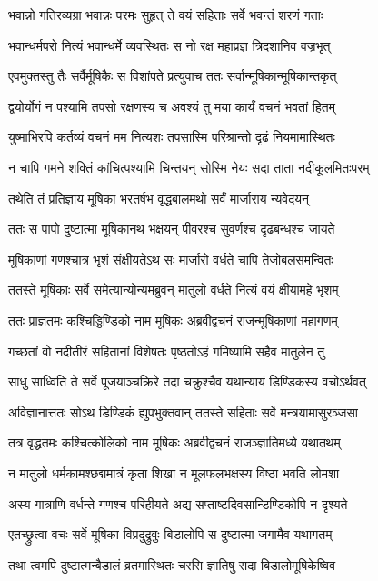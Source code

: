 \twolineshloka
{भवान्नो गतिरव्यग्रा भवान्नः परमः सुहृत्}
{ते वयं सहिताः सर्वे भवन्तं शरणं गताः}


\twolineshloka
{भवान्धर्मपरो नित्यं भवान्धर्मे व्यवस्थितः}
{स नो रक्ष महाप्रज्ञ त्रिदशानिव वज्रभृत्}


\twolineshloka
{एवमुक्तस्तु तैः सर्वैर्मूषिकैः स विशांपते}
{प्रत्युवाच ततः सर्वान्मूषिकान्मूषिकान्तकृत्}


\twolineshloka
{द्वयोर्योगं न पश्यामि तपसो रक्षणस्य च}
{अवश्यं तु मया कार्यं वचनं भवतां हितम्}


\twolineshloka
{युष्माभिरपि कर्तव्यं वचनं मम नित्यशः}
{तपसास्मि परिश्रान्तो दृढं नियमामास्थितः}


\twolineshloka
{न चापि गमने शक्तिं कांचित्पश्यामि चिन्तयन्}
{सोस्मि नेयः सदा ताता नदीकूलमितःपरम्}


\twolineshloka
{तथेति तं प्रतिज्ञाय मूषिका भरतर्षभ}
{वृद्धबालमथो सर्वं मार्जाराय न्यवेदयन्}


\twolineshloka
{ततः स पापो दुष्टात्मा मूषिकानथ भक्षयन्}
{पीवरश्च सुवर्णश्च दृढबन्धश्च जायते}


\twolineshloka
{मूषिकाणां गणश्चात्र भृशं संक्षीयतेऽथ सः}
{मार्जारो वर्धते चापि तेजोबलसमन्वितः}


\twolineshloka
{ततस्ते मूषिकाः सर्वे समेत्यान्योन्यमब्रुवन्}
{मातुलो वर्धते नित्यं वयं क्षीयामहे भृशम्}


\twolineshloka
{ततः प्राज्ञतमः कश्चिड्डिण्डिको नाम मूषिकः}
{अब्रवीद्वचनं राजन्मूषिकाणां महागणम्}


\twolineshloka
{गच्छतां वो नदीतीरं सहितानां विशेषतः}
{पृष्ठतोऽहं गमिष्यामि सहैव मातुलेन तु}


\twolineshloka
{साधु साध्विति ते सर्वे पूजयाञ्चक्रिरे तदा}
{चक्रुश्चैव यथान्यायं डिण्डिकस्य वचोऽर्थवत्}


\twolineshloka
{अविज्ञानात्ततः सोऽथ डिण्डिकं ह्युपभुक्तवान्}
{ततस्ते सहिताः सर्वे मन्त्रयामासुरञ्जसा}


\twolineshloka
{तत्र वृद्धतमः कश्चित्कोलिको नाम मूषिकः}
{अब्रवीद्वचनं राजञ्ज्ञातिमध्ये यथातथम्}


\twolineshloka
{न मातुलो धर्मकामश्छद्ममात्रं कृता शिखा}
{न मूलफलभक्षस्य विष्ठा भवति लोमशा}


\twolineshloka
{अस्य गात्राणि वर्धन्ते गणश्च परिहीयते}
{अद्य सप्ताष्टदिवसान्डिण्डिकोपि न दृश्यते}


\twolineshloka
{एतच्छ्रुत्वा वचः सर्वे मूषिका विप्रदुद्रुवुः}
{बिडालोपि स दुष्टात्मा जगामैव यथागतम्}


\twolineshloka
{तथा त्वमपि दुष्टात्मन्बैडालं व्रतमास्थितः}
{चरसि ज्ञातिषु सदा बिडालोमूषिकेष्विव}


